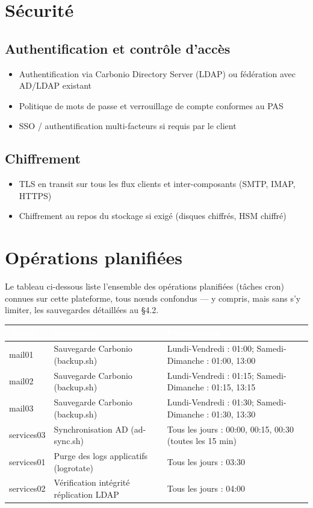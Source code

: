 \documentclass[11pt,a4paper]{report}
\newcommand{\tblhead}[1]{\textcolor{white}{\textbf{#1}}}
\begin{document}
\section{Sécurité}

\subsection{Authentification et contrôle d'accès}
\begin{itemize}[nosep]
  \item Authentification via Carbonio Directory Server (LDAP) ou fédération avec AD/LDAP existant
  \item Politique de mots de passe et verrouillage de compte conformes au PAS
  \item SSO / authentification multi-facteurs si requis par le client
\end{itemize}

\subsection{Chiffrement}
\begin{itemize}[nosep]
  \item TLS en transit sur tous les flux clients et inter-composants (SMTP, IMAP, HTTPS)
  \item Chiffrement au repos du stockage si exigé (disques chiffrés, HSM chiffré)
\end{itemize}

\section{Opérations planifiées}
Le tableau ci-dessous liste l'ensemble des opérations planifiées (tâches cron) connues sur cette plateforme, tous nœuds confondus --- y compris, mais sans s'y limiter, les sauvegardes détaillées au \S4.2.

\begin{longtable}{|p{2.6cm}|p{5.4cm}|p{5.2cm}|}
\hline
\rowcolor{primary}\tblhead{Nœud} & \tblhead{Opération} & \tblhead{Planification} \\
\hline
\endhead
mail01 & Sauvegarde Carbonio (backup.\allowbreak{}sh) & Lundi-\allowbreak{}Vendredi : 01:00; Samedi-\allowbreak{}Dimanche : 01:00, 13:00 \\
\hline
mail02 & Sauvegarde Carbonio (backup.\allowbreak{}sh) & Lundi-\allowbreak{}Vendredi : 01:15; Samedi-\allowbreak{}Dimanche : 01:15, 13:15 \\
\hline
mail03 & Sauvegarde Carbonio (backup.\allowbreak{}sh) & Lundi-\allowbreak{}Vendredi : 01:30; Samedi-\allowbreak{}Dimanche : 01:30, 13:30 \\
\hline
services03 & Synchronisation AD (ad-\allowbreak{}sync.\allowbreak{}sh) & Tous les jours : 00:00, 00:15, 00:30 (toutes les 15 min) \\
\hline
services01 & Purge des logs applicatifs (logrotate) & Tous les jours : 03:30 \\
\hline
services02 & Vérification intégrité réplication LDAP & Tous les jours : 04:00 \\
\hline
\end{longtable}
\end{document}
